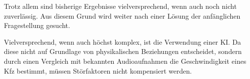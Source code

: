 Trotz allem sind bisherige Ergebnisse vielversprechend, wenn auch noch nicht zuverlässig. Aus diesem Grund wird weiter nach einer Lösung der anfänglichen Fragestellung gesucht.

Vielversprechend, wenn auch höchst komplex, ist die Verwendung einer KI. Da diese nicht auf Grundlage von physikalischen Beziehungen entscheidet, sondern durch einen Vergleich mit bekannten Audioaufnahmen die Geschwindigkeit eines Kfz bestimmt, müssen Störfaktoren nicht kompensiert werden.